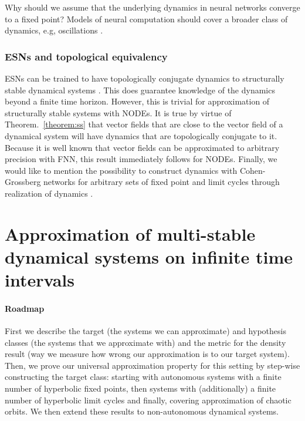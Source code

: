 \documentclass{article}
\theoremstyle{definition}
\theoremstyle{remark}
\newcounter{ct}
\begin{document}

Why should we assume that the underlying dynamics in neural networks converge to a fixed point?
Models of neural computation should cover a broader class of dynamics, e.g, oscillations \citep{townley2000existence, kag2020rnns, chang2019antisymmetricrnn,rapp1987periodic}. %




\subsubsection{ESNs and topological equivalency}%
ESNs can be trained to have  topologically conjugate dynamics to structurally stable dynamical systems \citep{hart2020embedding}.
This does guarantee knowledge of the dynamics beyond a finite time horizon.
However, this is trivial for approximation of structurally stable systems with NODEs.
It is true by virtue of Theorem.~\ref{theorem:ss} that vector fields that are close to the vector field of a dynamical system will have dynamics that are topologically conjugate to it.
Because it is well known that vector fields can be approximated to arbitrary precision with FNN, this result immediately follows for NODEs.
Finally, we would like to mention the possibility to construct dynamics with Cohen-Grossberg networks for arbitrary sets of fixed point and limit cycles through realization of dynamics \citep{cohen1992construction}.




\section{Approximation of multi-stable dynamical systems on infinite time intervals}
\paragraph{Roadmap}
First we describe the target (the systems we can approximate) and hypothesis classes (the systems that we approximate with) and the metric for the density result (way we measure how wrong our approximation is to our target system).
Then, we prove our universal approximation property for this setting by step-wise constructing the target class:
starting with autonomous systems with a finite number of hyperbolic fixed points,
then systems with (additionally) a finite number of hyperbolic limit cycles
and finally, covering approximation of chaotic orbits.
We then extend these results to non-autonomous dynamical systems.
\end{document}
